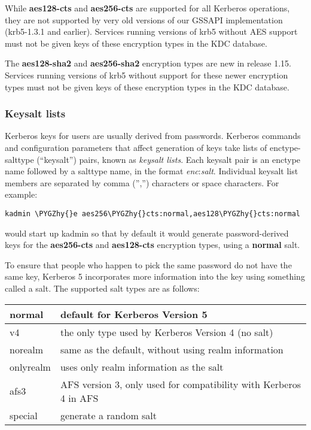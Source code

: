 \documentclass[letterpaper,10pt,english]{sphinxmanual}
\def\PYGZhy{\char`\-}
\begin{document}
While \textbf{aes128-cts} and \textbf{aes256-cts} are supported for all Kerberos
operations, they are not supported by very old versions of our GSSAPI
implementation (krb5-1.3.1 and earlier).  Services running versions of
krb5 without AES support must not be given keys of these encryption
types in the KDC database.

The \textbf{aes128-sha2} and \textbf{aes256-sha2} encryption types are new in
release 1.15.  Services running versions of krb5 without support for
these newer encryption types must not be given keys of these
encryption types in the KDC database.


\subsubsection{Keysalt lists}
\label{admin/conf_files/kdc_conf:id7}\label{admin/conf_files/kdc_conf:keysalt-lists}
Kerberos keys for users are usually derived from passwords.  Kerberos
commands and configuration parameters that affect generation of keys
take lists of enctype-salttype (``keysalt'') pairs, known as \emph{keysalt
lists}.  Each keysalt pair is an enctype name followed by a salttype
name, in the format \emph{enc}:\emph{salt}.  Individual keysalt list members are
separated by comma ('','') characters or space characters.  For example:

\begin{Verbatim}[commandchars=\\\{\}]
kadmin \PYGZhy{}e aes256\PYGZhy{}cts:normal,aes128\PYGZhy{}cts:normal
\end{Verbatim}

would start up kadmin so that by default it would generate
password-derived keys for the \textbf{aes256-cts} and \textbf{aes128-cts}
encryption types, using a \textbf{normal} salt.

To ensure that people who happen to pick the same password do not have
the same key, Kerberos 5 incorporates more information into the key
using something called a salt.  The supported salt types are as
follows:

\begin{tabulary}{\linewidth}{|L|L|}
\hline

normal
 & 
default for Kerberos Version 5
\\
\hline
v4
 & 
the only type used by Kerberos Version 4 (no salt)
\\
\hline
norealm
 & 
same as the default, without using realm information
\\
\hline
onlyrealm
 & 
uses only realm information as the salt
\\
\hline
afs3
 & 
AFS version 3, only used for compatibility with Kerberos 4 in AFS
\\
\hline
special
 & 
generate a random salt
\\
\hline\end{tabulary}
\end{document}
